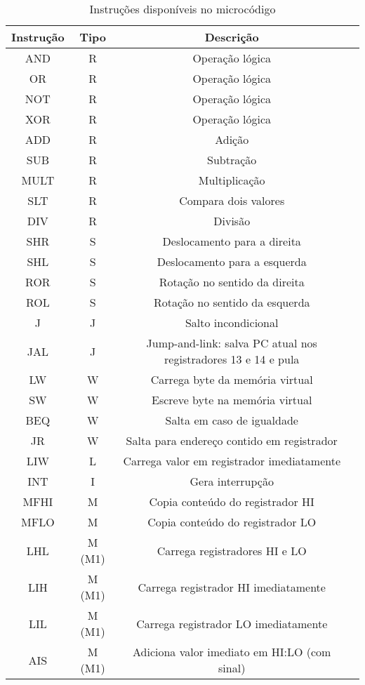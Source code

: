 \documentclass[11pt]{report}
\begin{document}
\begin{table}[H]
\caption{Instruções disponíveis no microcódigo}
\label{tab:inst}
\begin{tabular}{c c c c}
\hline
Instrução	&	Tipo		&	Descrição\\
\hline
AND			&	R		&	Operação lógica\\
OR			&	R		&	Operação lógica\\
NOT			&	R		&	Operação lógica\\
XOR			&	R		&	Operação lógica\\
ADD			&	R		&	Adição\\
SUB			&	R		&	Subtração\\
MULT			&	R		&	Multiplicação\\
SLT			&	R		&	Compara dois valores\\
DIV			&	R		&	Divisão\\
\hline
SHR			&	S		&	Deslocamento para a direita\\
SHL			&	S		&	Deslocamento para a esquerda\\
ROR			&	S		&	Rotação no sentido da direita\\
ROL			&	S		&	Rotação no sentido da esquerda\\
\hline
J			&	J		&	Salto incondicional\\
JAL			&	J		&	Jump-and-link: salva PC atual nos registradores 13 e 14 e pula\\
\hline
LW			&	W		&	Carrega byte da memória virtual\\
SW			&	W		&	Escreve byte na memória virtual\\
BEQ			&	W		&	Salta em caso de igualdade\\
JR			&	W		&	Salta para endereço contido em registrador\\
\hline
LIW			&	L		&	Carrega valor em registrador imediatamente\\
\hline
INT			&	I		&	Gera interrupção\\
\hline
MFHI			&	M		&	Copia conteúdo do registrador HI\\
MFLO			&	M		&	Copia conteúdo do registrador LO\\
LHL			&	M (M1)	&	Carrega registradores HI e LO\\
LIH			&	M (M1)	&	Carrega registrador HI imediatamente\\
LIL			&	M (M1)	&	Carrega registrador LO imediatamente\\
AIS			&	M (M1)	&	Adiciona valor imediato em HI:LO (com sinal)\\
\end{tabular}
\end{table}
\end{document}

